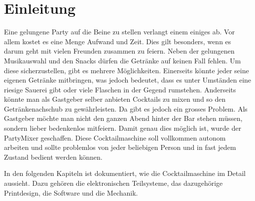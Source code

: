 \clearpage
\section{Einleitung}
\label{sec:Einleitung}
Eine gelungene Party auf die Beine zu stellen verlangt einem einiges ab. Vor allem kostet es eine Menge Aufwand und Zeit. Dies gilt besonders, wenn es darum geht mit vielen Freunden zusammen zu feiern. Neben der gelungenen Musikauswahl und den Snacks dürfen die Getränke auf keinen Fall fehlen. Um diese sicherzustellen, gibt es mehrere Möglichkeiten. Einerseits könnte jeder seine eigenen Getränke mitbringen, was jedoch bedeutet, dass es unter Umständen eine riesige Sauerei gibt oder viele Flaschen in der Gegend rumstehen. Anderseits könnte man als Gastgeber selber anbieten Cocktails zu mixen und so den Getränkenachschub zu gewährleisten. Da gibt es jedoch ein grosses Problem. Als Gastgeber möchte man nicht den ganzen Abend hinter der Bar stehen müssen, sondern lieber bedenkenlos mitfeiern. Damit genau dies möglich ist, wurde der PartyMixer geschaffen. Diese Cocktailmaschine soll vollkommen autonom arbeiten und sollte problemlos von jeder beliebigen Person und in fast jedem Zustand bedient werden können. 

In den folgenden Kapiteln ist dokumentiert, wie die Cocktailmaschine im Detail aussieht. Dazu gehören die elektronischen Teilsysteme, das dazugehörige Printdesign, die Software und die Mechanik.